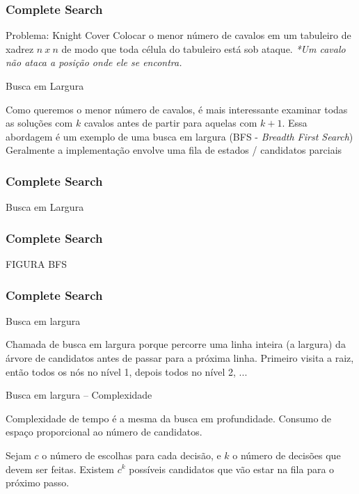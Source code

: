 \begin{frame}
\frametitle{Complete Search}
\begin{block}{Problema: Knight Cover}
\scriptsize
Colocar o menor número de cavalos em um tabuleiro de xadrez $n\ x \ n$ de modo que toda célula do tabuleiro está sob ataque.
\tiny{\emph{*Um cavalo não ataca a posição onde ele se encontra.}}
\end{block}
\pause
\begin{block}{Busca em Largura}
\begin{itemize}[<+->]
	\bitem Como queremos o menor número de cavalos, é mais interessante examinar todas as soluções com $k$ cavalos
	antes de partir para aquelas com $k+1$.
	\bitem Essa abordagem é um exemplo de uma busca em largura (BFS - \emph{Breadth First Search})
	\bitem Geralmente a implementação envolve uma fila de estados / candidatos parciais
\end{itemize}
\end{block}
\end{frame}

\begin{frame}
\frametitle{Complete Search}
\begin{block}{Busca em Largura}
\end{block}
\end{frame}

\begin{frame}
\frametitle{Complete Search}
\huge FIGURA BFS
\end{frame}

\begin{frame}
\frametitle{Complete Search}
\begin{block}{Busca em largura}
\begin{itemize}
	\bitem Chamada de busca em largura porque percorre uma linha inteira (a largura) da árvore de candidatos antes de passar para a próxima linha.
	\bitem Primeiro visita a raiz, então todos os nós no nível 1, depois todos no nível 2, ...
\end{itemize}
\end{block}
\pause
\begin{block}{Busca em largura -- Complexidade}
\begin{itemize}
	\bitem Complexidade de tempo é a mesma da busca em profundidade.
	\bitem Consumo de espaço proporcional ao número de candidatos.
	\begin{itemize}
		\bitem Sejam $c$ o número de escolhas para cada decisão, e $k$ o número de decisões que devem ser feitas.
		\bitem Existem $c^k$ possíveis candidatos que vão estar na fila para o próximo passo.
	\end{itemize}
\end{itemize}
\end{block}
\end{frame}

